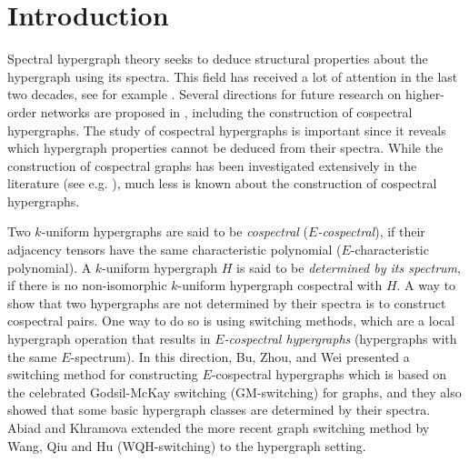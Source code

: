 \documentclass[12pt]{article}
\numberwithin{equation}{section}
\theoremstyle{definition}
\begin{document}
\section{Introduction}


Spectral hypergraph theory seeks to deduce structural properties about the hypergraph using its spectra. This field has received a lot of attention in the last two decades, see for example \cite{C2012,CD2015,FL1996,LZ2017,R2002,SSP2022,shao,SQH2015,W2022,XW2019,ZKSB2017}. Several directions for future research on higher-order networks are proposed in \cite{Abiad_2026}, including the construction of cospectral hypergraphs. The study of cospectral hypergraphs is important since it reveals which hypergraph properties cannot be deduced from their spectra. While the construction of cospectral graphs has
been investigated extensively in the literature (see e.g. \cite{ah2012, gm1982,HH1988,QJW2020,s1973}), much less is known about the construction of cospectral hypergraphs. 




Two $k$-uniform hypergraphs are said to be \emph{cospectral} (\emph{$E$-cospectral}), if their adjacency tensors have the same characteristic polynomial ($E$-characteristic polynomial). A $k$-uniform hypergraph $H$ is said to be \emph{determined by its spectrum}, if there is no non-isomorphic $k$-uniform hypergraph cospectral with $H$. A way to show that two hypergraphs are not determined by their spectra is to construct cospectral pairs. One way to do so is using switching methods, which are a local hypergraph operation that results in \emph{$E$-cospectral hypergraphs} (hypergraphs with the same $E$-spectrum). In this direction, Bu, Zhou, and Wei \cite{bzw2014} presented a switching method for constructing $E$-cospectral hypergraphs which is based on the celebrated Godsil-McKay switching (GM-switching) for graphs, and they also showed that some basic hypergraph classes are determined by their spectra. Abiad and Khramova \cite{AK2024} extended the more recent graph switching method by Wang, Qiu and Hu (WQH-switching) to the hypergraph setting. 
\end{document}
